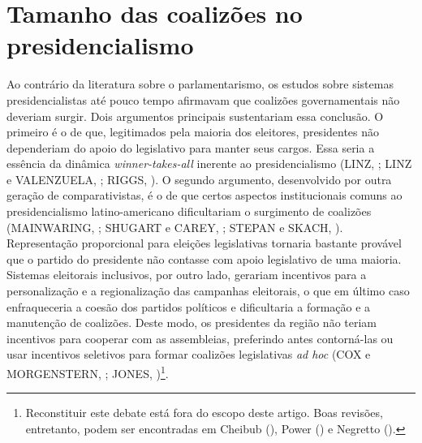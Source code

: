 \section{Tamanho das coalizões no presidencialismo}

Ao contrário da literatura sobre o parlamentarismo, os estudos sobre sistemas presidencialistas até pouco tempo afirmavam que coalizões governamentais não deveriam surgir. Dois argumentos principais sustentariam essa conclusão. O primeiro é o de que, legitimados pela maioria dos eleitores, presidentes não dependeriam do apoio do legislativo para manter seus cargos. Essa seria a essência da dinâmica \textit{winner-takes-all} inerente ao presidencialismo (LINZ, \citeyear{linz1990}; LINZ e VALENZUELA, \citeyear{linz1994}; RIGGS, \citeyear{riggs1988}). O segundo argumento, desenvolvido por outra geração de comparativistas, é o de que certos aspectos institucionais comuns ao presidencialismo latino-americano dificultariam o surgimento de coalizões (MAINWARING, \citeyear{mainwaring1993}; SHUGART e CAREY, \citeyear{shugart1992}; STEPAN e SKACH, \citeyear{stepan1993}). Representação proporcional para eleições legislativas tornaria bastante provável que o partido do presidente não contasse com apoio legislativo de uma maioria. Sistemas eleitorais inclusivos, por outro lado, gerariam incentivos para a personalização e a regionalização das campanhas eleitorais, o que em último caso enfraqueceria a coesão dos partidos políticos e dificultaria a formação e a manutenção de coalizões. Deste modo, os presidentes da região não teriam incentivos para cooperar com as assembleias, preferindo antes contorná-las ou usar incentivos seletivos para formar coalizões legislativas \textit{ad hoc} (COX e MORGENSTERN, \citeyear{cox2001}; JONES, \citeyear{jones1995})\footnote{Reconstituir este debate está fora do escopo deste artigo. Boas revisões, entretanto, podem ser encontradas em Cheibub (\citeyear{cheibub2007}), Power (\citeyear{power2010}) e Negretto (\citeyear{negretto2006}).}.

